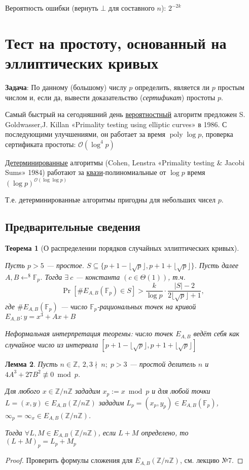\documentclass[12pt]{article}
\newcommand{\Z}{{{\mathbb Z}}}
\newcommand{\F}{{{\mathbb F}}}
\newcommand{\bigO}{\mathcal{O}}
\newtheorem{theorem}{Теорема}
\newtheorem{lemma}[theorem]{Лемма}
\theoremstyle{definition}
\theoremstyle{definition}
\theoremstyle{definition}
\begin{document}
Вероятность ошибки (вернуть $\bot$ для составного $n$): $2^{-2k}$


\section{Тест на простоту, основанный на эллиптических кривых}

\textbf{Задача}: По данному (большому) числу $p$ определить, является ли $p$ простым числом и, если да, вывести доказательство (\textit{сертификат}) простоты $p$. 

Самый быстрый на сегодняшний день \underline{вероятностный} алгоритм предложен S. Goldwasser,J. Killan «Primality testing using elliptic curves» в 1986. С последующими улучшениями, он работает за время $\operatorname{poly}\log p$, проверка сертификата простоты: $\bigO(\log^4 p)$

\underline{Детерминированные} алгоритмы (Cohen, Lenstra «Primality testing \& Jacobi Sums» 1984) работают за \underline{квази}-полиномиальные от $\log p$ время $(\log p)^{\bigO(\log\log p)}$

Т.е. детерминированные алгоритмы пригодны для небольших чисел $p$.

\subsection{Предварительные сведения}

\begin{theorem}[О распределении порядков случайных эллиптических кривых]
\label{t1}

Пусть $p>5$ — простое. $S \subseteq \{ p+1-\lfloor\sqrt{p}\rfloor, p+1+\lfloor\sqrt{p}\rfloor \}$.
Пусть далее $A, B \leftarrow^{\$} \F_p$. Тогда $\exists\ c$ — константа $(c \in \Theta(1))$, т.ч.
\[
    \Pr\left[\#E_{A,B}(\F_p) \in S \right] > \frac{k}{\log p} \cdot \frac{|S|-2}{2\lfloor\sqrt{p}\rfloor + 1},
\]
где $\#E_{A,B}(\F_p)$ — число $\F_p$-рациональных точек на кривой $E_{A,B}: y = x^3 + Ax+B$

Неформальная интерпретация теоремы: число точек $E_{A,B}$ ведёт себя как случайное число из интервала $\left[p+1-\lfloor\sqrt{p}\rfloor, p+1+\lfloor\sqrt{p}\rfloor \right]$
\end{theorem}

\begin{lemma}
\label{l2}
    Пусть $n \in \Z,\ 2,3\nmid \ n;\; p>3$ — простой делитель $n$ и $4A^3 + 27B^2 \not\equiv 0\bmod p$.
    
    Для любого $x \in \Z/n\Z$ зададим $x_p := x\bmod p$ и  для любой точки $L = (x,y) \in E_{A,B}( \Z/n\Z)$ зададим $L_p = (x_p, y_p) \in E_{A,B}(\F_p)$,  $\infty_p = \infty_x \in E_{A, B}(\Z/n\Z)$. 
    
    Тогда $\forall L, M \in E_{A,B}(\Z/n\Z)$, если $L+M$ определено, то $(L+M)_p = L_p+M_p$
\end{lemma}
\begin{proof}
    Проверить формулы сложения для $E_{A,B}(\Z/n\Z)$, см. лекцию №7.
\end{proof}
\end{document}
